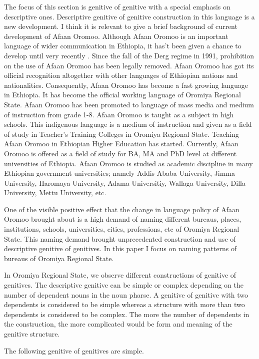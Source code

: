 \documentclass[11pt,a4paper]{article}
\begin{document}
	
	The focus of this section is genitive of genitive with a special emphasis on descriptive ones. Descriptive genitive of genitive construction in this language is a new development. I think it is relevant to give a brief background of current development of Afaan Oromoo. Although Afaan Oromoo is an important language of wider communication in Ethiopia, it has’t been given 
	a chance to develop until very recently \cite[326]{bulcha1997politics}. Since the fall of the Derg regime in 1991, prohibition on the use of Afaan Oromoo has been 
	legally removed. Afaan Oromoo has got its official recognition altogether with other languages of Ethiopian nations and nationalities.  Consequently, 
	Afaan Oromoo has become a fast growing language in Ethiopia. It has become the official working language of Oromiya Regional State. Afaan Oromoo has been 
	promoted to language of mass media and medium of instruction from grade 1-8. Afaan Oromoo is taught as a subject in high schools. This indigenous language 
	is a medium of instruction and given as a field of study in Teacher’s Training Colleges in Oromiya Regional State. Teaching Afaan 	Oromoo in Ethiopian Higher Education has started. Currently, Afaan Oromoo is offered as a field of study for BA, MA and PhD level at different 
	universities of Ethiopia. Afaan Oromoo is studied as academic discipline in many Ethiopian government universities; namely Addis Ababa University, 
	Jimma University, Haromaya University, Adama Universitiy, Wallaga University, Dilla University, Mettu University, etc. 
	
	One of the visible positive effect that the change in language policy of Afaan Oromoo brought about is a high demand of naming different bureaus, places, institutions, schools, universities, cities, professions, etc of Oromiya Regional State. This naming demand brought unprecedented construction and use of  descriptive genitive of genitives. In this paper I focus on naming patterns of bureaus of Oromiya Regional State. 
	
	In Oromiya Regional State, we observe different constructions of genitive of genitives. The descriptive genitive can be simple or complex depending on the number of dependent nouns in the noun pharse. A genitive of genitive with two dependents is considered to be simple whereas a structure with more than two dependents is considered to be complex. The more the number of dependents in the construction, the more complicated would be form and meaning of the genitive structure. 
	
	The following genitive of genitives are simple.
	
\end{document}
